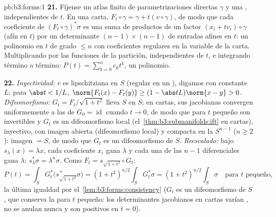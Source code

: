\begin{solution}{pb:b3:forms:1}
\textbf{21.} Fíjense un atlas finito de parametrizaciones directas
$\gamma$ y una ,
independientes de $t$. En una carta,
$F_t\circ\gamma = \gamma + t(v\circ\gamma)$, de modo que cada
coeficiente de $(F_t\circ\gamma)^*\sigma$ es una suma de productos de un
factor $(x_i + tv_i)\circ\gamma$ (afín en $t$) por un determinante
$(n-1)\times(n-1)$ de entradas afines en $t$: un polinomio en $t$ de
grado $\leq n$ con coeficientes regulares en la variable de la carta.
Multiplicando por las funciones de la partición, independientes de $t$,
e integrando término a término: $P(t) = \sum_{k=0}^n c_kt^k$, un
polinomio.

\textbf{22.} \emph{Inyectividad:} $v$ es lipschitziana en $S$ (regular
en un ), digamos con constante
$L$; para $\abs t <
1/L$, $\norm{F_t(x) - F_t(y)} \geq (1 - \abs
tL)\norm{x - y} > 0$. \emph{Difeomorfismo:} $G_t =
F_t/\sqrt{1 + t^2}$ lleva $S$ en $S$; en cartas, sus jacobianas
convergen uniformemente a las de $G_0 = \operatorname{id}$ cuando
$t \to 0$, de modo que para $t$ pequeño son invertibles y $G_t$ es un
difeomorfismo local (el~\cref{thm:b3:submanifolds:ift} en cartas),
inyectivo, con imagen abierta (difeomorfismo local) y
compacta en la
\emph{} $S^{n-1}$
($n \geq 2$): imagen $= S$, de modo que $G_t$ es un difeomorfismo de
$S$. \emph{Reescalado:} bajo $s_\lambda(x) = \lambda x$, cada
coeficiente $x_i$ gana $\lambda$ y cada una de las $n - 1$ diferenciales
gana $\lambda$: $s_\lambda^*\sigma =
\lambda^n\sigma$. Como $F_t = s_{\sqrt{1+t^2}}\circ G_t$:
\[
P(t) = \int_SG_t^*\bigl(s_{\sqrt{1+t^2}}^{\,*}\sigma\bigr)
= (1 + t^2)^{n/2}\int_SG_t^*\sigma
= (1 + t^2)^{n/2}\int_S\sigma
\quad\text{para } t \text{ pequeño},
\]
la última igualdad por el~\cref{lem:b3:forms:consistency} ($G_t$ es un
difeomorfismo de $S$, que conserva la  para $t$ pequeño: los
determinantes jacobianos en cartas varían
, no se anulan nunca y
son positivos en $t = 0$).


\end{solution}
